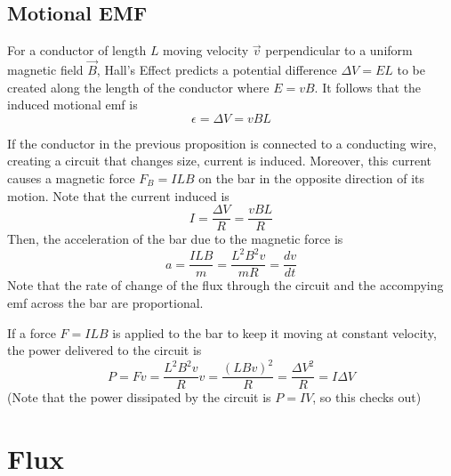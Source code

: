 \documentclass[12pt]{report}
\begin{document}
\subsection{Motional EMF}

\begin{prop}{}{}
        For a conductor of length $L$ moving velocity $\vec{v}$ perpendicular to a uniform magnetic field $\vec{B}$, Hall's Effect predicts a potential difference $\Delta V = EL$ to be created along the length of the conductor where $E = vB$. It follows that the induced motional emf is \begin{equation}
                \epsilon = \Delta V = vBL
        \end{equation}
\end{prop}

\begin{rmk}{}{}
        If the conductor in the previous proposition is connected to a conducting wire, creating a circuit that changes size, current is induced. Moreover, this current causes a magnetic force $F_B = ILB$ on the bar in the opposite direction of its motion. Note that the current induced is \begin{equation}
                I = \frac{\Delta V}{R} = \frac{vBL}{R}
        \end{equation}
        Then, the acceleration of the bar due to the magnetic force is \begin{equation}
                a = \frac{ILB}{m} = \frac{L^2B^2v}{mR} = \frac{dv}{dt}
        \end{equation}
        Note that the rate of change of the flux through the circuit and the accompying emf across the bar are proportional.
\end{rmk}


\begin{rmk}{}{}
        If a force $F = ILB$ is applied to the bar to keep it moving at constant velocity, the power delivered to the circuit is \begin{equation}
                P = Fv = \frac{L^2B^2v}{R}v = \frac{(LBv)^2}{R} = \frac{\Delta V^2}{R} = I\Delta V
        \end{equation}
        (Note that the power dissipated by the circuit is $P = IV$, so this checks out)
\end{rmk}


\section{Flux}
\end{document}

